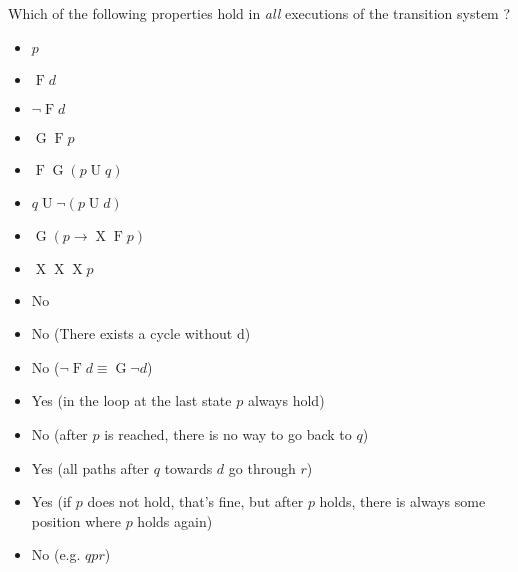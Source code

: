 \documentclass[language=en,sheet=4,prefix]{exercise}
\newcommand{\U}{\ensuremath{\operatorname{U}}\xspace}
\newcommand{\X}{\ensuremath{\operatorname{X}}\xspace}
\newcommand{\G}{\ensuremath{\operatorname{G}}\xspace}
\newcommand{\F}{\ensuremath{\operatorname{F}}\xspace}
\begin{document}

  
Which of the following properties hold in \emph{all} executions of the transition system ?

\begin{minipage}[t]{\textwidth}
  \begin{minipage}{.4\textwidth}
    \begin{itemize}
      \item $p$
      \item $\F d$
      \item $¬\F d$
      \item $\G\F p$
      \end{itemize}
  \end{minipage}
  \begin{minipage}{.4\textwidth}
    \begin{itemize}
      \item $\F\G(p\U q)$
      \item $q \U ¬(p\U d)$
      \item $\G(p \rightarrow \X\F p)$
      \item $\X\X\X p$
      \end{itemize}
  \end{minipage}
\end{minipage}
\begin{solution}
\begin{minipage}[t]{\textwidth}
  \begin{minipage}{.4\textwidth}
    \begin{itemize}
      \item No
      \item No (There exists a cycle without d)
      \item No ($¬\F d \equiv \G \neg d$)
      \item Yes (in the loop at the last state $p$ always hold)
      \end{itemize}
  \end{minipage}
  \begin{minipage}{.4\textwidth}
    \begin{itemize}
      \item No (after $p$ is reached, there is no way to go back to $q$)
      \item Yes (all paths after $q$ towards $d$ go through $r$)
      \item Yes (if $p$ does not hold, that's fine, but after $p$ holds, there is always some position where $p$ holds again)
      \item No (e.g. $q p r$)
      \end{itemize}
  \end{minipage}
\end{minipage}
\end{solution}
\end{document}
